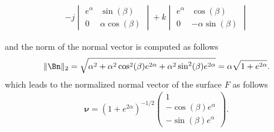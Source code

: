 \documentclass[12pt]{article}
\begin{document}
\begin{enumerate}[(i)]
\begin{observationboxed}
\begin{align}
			      - 
			      j \begin{vmatrix} e^\alpha & \sin(\beta) \\ 0 & \alpha\cos(\beta) \end{vmatrix}
			      + 
			      k \begin{vmatrix} e^\alpha & \cos(\beta) \\ 0        & -\alpha\sin(\beta) \end{vmatrix}
		      \end{align}
	      \end{observationboxed}
	      and the norm of the normal vector is computed as follows
	      \begin{align}
		      \| \Bn \|_2
		      = \sqrt{\alpha^2 + \alpha^2\cos^2(\beta)e^{2\alpha} + \alpha^2\sin^2(\beta)e^{2\alpha}}
		      = \alpha \sqrt {1+e^{2\alpha}}.
	      \end{align}
	      which leads to the normalized normal vector of the surface $F$ as follows
	      \begin{align}
		      \boxed{
			      \bm{\nu}
			      = \left(1+e^{2\alpha}\right)^{-1/2}
			      \begin{pmatrix} 1\\-\cos(\beta)e^\alpha\\-\sin(\beta)e^\alpha\end{pmatrix}.
		      }
	      \end{align}
	      

\end{enumerate}
\end{document}
